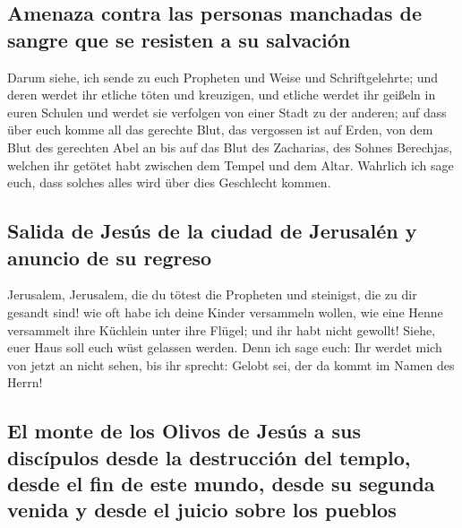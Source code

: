 \hypertarget{amenaza-contra-las-personas-manchadas-de-sangre-que-se-resisten-a-su-salvaciuxf3n}{%
\subsection{Amenaza contra las personas manchadas de sangre que se
resisten a su
salvación}\label{amenaza-contra-las-personas-manchadas-de-sangre-que-se-resisten-a-su-salvaciuxf3n}}

 Darum siehe, ich sende zu euch Propheten und Weise und
Schriftgelehrte; und deren werdet ihr etliche töten und kreuzigen, und
etliche werdet ihr geißeln in euren Schulen und werdet sie verfolgen von
einer Stadt zu der anderen;  auf dass über euch komme all
das gerechte Blut, das vergossen ist auf Erden, von dem Blut des
gerechten Abel an bis auf das Blut des Zacharias, des Sohnes Berechjas,
welchen ihr getötet habt zwischen dem Tempel und dem Altar.
 Wahrlich ich sage euch, dass solches alles wird über
dies Geschlecht kommen.

\hypertarget{salida-de-jesuxfas-de-la-ciudad-de-jerusaluxe9n-y-anuncio-de-su-regreso}{%
\subsection{Salida de Jesús de la ciudad de Jerusalén y anuncio de su
regreso}\label{salida-de-jesuxfas-de-la-ciudad-de-jerusaluxe9n-y-anuncio-de-su-regreso}}

 Jerusalem, Jerusalem, die du tötest die Propheten und
steinigst, die zu dir gesandt sind! wie oft habe ich deine Kinder
versammeln wollen, wie eine Henne versammelt ihre Küchlein unter ihre
Flügel; und ihr habt nicht gewollt!  Siehe, euer Haus
soll euch wüst gelassen werden.  Denn ich sage euch: Ihr
werdet mich von jetzt an nicht sehen, bis ihr sprecht: Gelobt sei, der
da kommt im Namen des Herrn!

\hypertarget{el-monte-de-los-olivos-de-jesuxfas-a-sus-discuxedpulos-desde-la-destrucciuxf3n-del-templo-desde-el-fin-de-este-mundo-desde-su-segunda-venida-y-desde-el-juicio-sobre-los-pueblos}{%
\subsection{El monte de los Olivos de Jesús a sus discípulos desde la
destrucción del templo, desde el fin de este mundo, desde su segunda
venida y desde el juicio sobre los
pueblos}\label{el-monte-de-los-olivos-de-jesuxfas-a-sus-discuxedpulos-desde-la-destrucciuxf3n-del-templo-desde-el-fin-de-este-mundo-desde-su-segunda-venida-y-desde-el-juicio-sobre-los-pueblos}}

